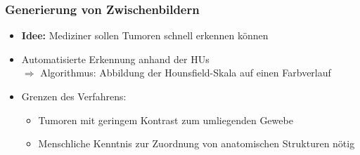 \documentclass[14pt]{beamer}
\begin{document}
\begin{frame}[allowframebreaks]
 \frametitle{Generierung von Zwischenbildern}
    \begin{itemize}
     \item \textbf{Idee:} Mediziner sollen Tumoren schnell erkennen können
     \item Automatisierte Erkennung anhand der HUs\\
	  $\Rightarrow$ Algorithmus: Abbildung der Hounsfield-Skala auf einen Farbverlauf
     \item Grenzen des Verfahrens:
      \begin{itemize}
	\item Tumoren mit geringem Kontrast zum umliegenden Gewebe
	\item Menschliche Kenntnis zur Zuordnung von anatomischen Strukturen nötig
      \end{itemize}
    \end{itemize}
\end{frame}
\end{document}
